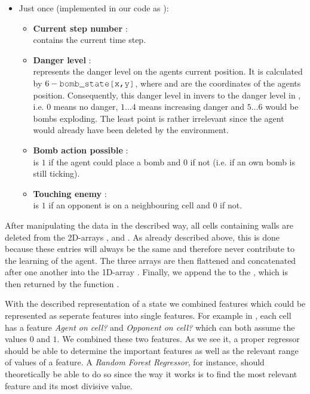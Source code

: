 \begin{itemize}
\begin{itemize}
		\end{itemize}
		\item Just once (implemented in our code as ):
		\begin{itemize}
			\item \textbf{Current step number }:\\
			 contains the current time step.
			\item \textbf{Danger level} :\\
			 represents the danger level on the agents current position. It is calculated by $6 - \text{\code{bomb\_state[x,y]}}$, where  and  are the coordinates of the agents position. Consequently, this danger level in invers to the danger level in , i.e. $0$ means no danger, $1\dots4$ means increasing danger and $5\dots6$ would be bombs exploding. The least point is rather irrelevant since the agent would already have been deleted by the environment.
			\item \textbf{Bomb action possible }:\\
			 is $1$ if the agent could place a bomb and $0$ if not (i.e. if an own bomb is still ticking).
			\item \textbf{Touching enemy} :\\
			 is $1$ if an opponent is on a neighbouring cell and $0$ if not.
		\end{itemize}
	\end{itemize}

	After manipulating the data in the described way, all cells containing walls are deleted from the 2D-arrays ,  and . As already described above, this is done because these entries will always be the same and therefore never contribute to the learning of the agent. The three arrays are then flattened and concatenated after one another into the 1D-array . Finally, we append the  to the , which is then returned by the function .\par
	
	With the described representation of a state we combined features which could be represented as seperate features into single features. For example in \cite{paper}, each cell has a feature \textit{Agent on cell?} and \textit{Opponent on cell?} which can both assume the values $0$ and $1$. We combined these two features. As we see it, a proper regressor should be able to determine the important features as well as the relevant range of values of a feature. A \textit{Random Forest Regressor}, for instance, should theoretically be able to do so since the way it works is to find the most relevant feature and its most divisive value.
	
